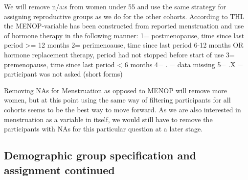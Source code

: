 \documentclass[
]{article}
\newenvironment{Shaded}{\begin{snugshade}}{\end{snugshade}}
\newcommand{\AttributeTok}[1]{\textcolor[rgb]{0.77,0.63,0.00}{#1}}
\newcommand{\DecValTok}[1]{\textcolor[rgb]{0.00,0.00,0.81}{#1}}
\newcommand{\FunctionTok}[1]{\textcolor[rgb]{0.00,0.00,0.00}{#1}}
\newcommand{\NormalTok}[1]{#1}
\newcommand{\OtherTok}[1]{\textcolor[rgb]{0.56,0.35,0.01}{#1}}
\newcommand{\SpecialCharTok}[1]{\textcolor[rgb]{0.00,0.00,0.00}{#1}}
\newcommand{\StringTok}[1]{\textcolor[rgb]{0.31,0.60,0.02}{#1}}
\begin{document}
\begin{Shaded}
\end{Shaded}

We will remove n/a:s from women under 55 and use the same strategy for
assigning reproductive groups as we do for the other cohorts. According
to THL the MENOP-variable has been constructed from reported
menstruation and use of hormone therapy in the following manner: 1=
postmenopause, time since last period \textgreater= 12 months 2=
perimenoause, time since last period 6-12 months OR hormone replacement
therapy, period had not stopped before start of use 3= premenopause,
time since last period \textless{} 6 months 4= . = data missing 5= .X =
participant was not asked (short forms)

Removing NAs for Menstruation as opposed to MENOP will remove more
women, but at this point using the same way of filtering participants
for all cohorts seems to be the best way to move forward. As we are also
interested in menstruation as a variable in itself, we would still have
to remove the participants with NAs for this particular question at a
later stage.

\hypertarget{demographic-group-specification-and-assignment-continued}{%
\subsection{Demographic group specification and assignment
continued}\label{demographic-group-specification-and-assignment-continued}}
\end{document}
